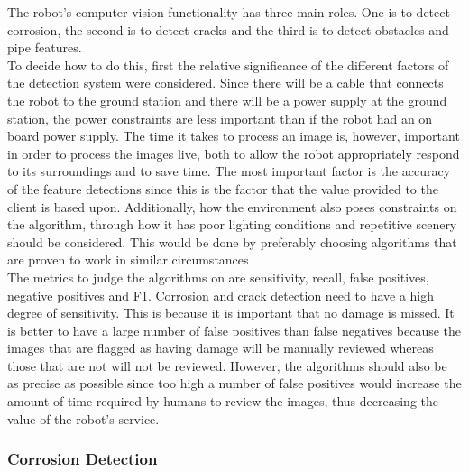 \documentclass[11pt]{article}		%
\begin{document}
			The robot’s computer vision functionality has three main roles. 
			One is to detect corrosion, the second is to detect cracks and the third is to detect obstacles and pipe features.
			\\
	        To decide how to do this, first the relative significance of the different factors of the detection system were considered. 
	        Since there will be a cable that connects the robot to the ground station and there will be a power supply at the ground station, the power constraints are less important than if the robot had an on board power supply. 
	        The time it takes to process an image is, however, important in order to process the images live, both to allow the robot appropriately respond to its surroundings and to save time. 
	        The most important factor is the accuracy of the feature detections since this is the factor that the value provided to the client is based upon.
	        Additionally, how the environment also poses constraints on the algorithm, through how it has poor lighting conditions and repetitive scenery should be considered. This would be done by preferably choosing algorithms that are proven to work in similar circumstances
	        \\
	        The metrics to judge the algorithms on are sensitivity, recall, false positives, negative positives and F1.
	        Corrosion and crack detection need to have a high degree of sensitivity. 
	        This is because it is important that no damage is missed. 
	        It is better to have a large number of false positives than false negatives because the images that are flagged as having damage will be manually reviewed whereas those that are not will not be reviewed. 
	        However, the algorithms should also be as precise as possible since too high a number of false positives would increase the amount of time required by humans to review the images, thus decreasing the value of the robot’s service.
        
        \subsubsection{Corrosion Detection}
\end{document}
